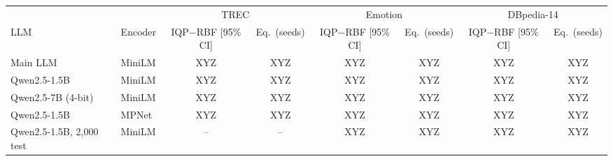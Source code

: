 \begin{tabular}{@{}ll cc cc cc@{}}
\toprule
 & & \multicolumn{2}{c}{TREC} & \multicolumn{2}{c}{Emotion} & \multicolumn{2}{c}{DBpedia-14} \\
\cmidrule(lr){3-4}\cmidrule(lr){5-6}\cmidrule(lr){7-8}
LLM & Encoder & IQP$-$RBF [95\% CI] & Eq.\ (seeds) & IQP$-$RBF [95\% CI] & Eq.\ (seeds) & IQP$-$RBF [95\% CI] & Eq.\ (seeds) \\
\midrule
Main LLM & MiniLM & XYZ & XYZ & XYZ & XYZ & XYZ & XYZ \\
Qwen2.5-1.5B & MiniLM & XYZ & XYZ & XYZ & XYZ & XYZ & XYZ \\
Qwen2.5-7B (4-bit) & MiniLM & XYZ & XYZ & XYZ & XYZ & XYZ & XYZ \\
Qwen2.5-1.5B & MPNet & XYZ & XYZ & XYZ & XYZ & XYZ & XYZ \\
Qwen2.5-1.5B, 2{,}000 test & MiniLM & -- & -- & XYZ & XYZ & XYZ & XYZ \\
\bottomrule
\end{tabular}
